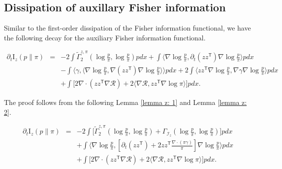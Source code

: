 \documentclass[11pt,reqno]{amsart}
\newcommand{\la}{\langle}
\newcommand{\ra}{\rangle}
\newcommand{\ts}{\mathsf{T}}
\newcommand{\bea}{\begin{eqnarray}}
\newcommand{\eea}{\end{eqnarray}}
\def\pa{\partial}
\begin{document}
\subsection{Dissipation of auxillary Fisher information}\label{sec fish z}
Similar to the first-order dissipation of the Fisher information functional, we have the following decay for the auxiliary Fisher information functional. 
\begin{proposition}
	\label{prop: dissipation of fisher z}
	\bea
\pa_t\mathrm I_{z}({p} \|\pi) &=& -2\int \widetilde\Gamma_2^{z,\pi}(\log\frac{{p} }{\pi},\log\frac{{p} }{\pi}){p}  dx
+\int \la \nabla\log\frac{{p} }{\pi},\pa_t(zz^{\ts})\nabla\log\frac{{p} }{\pi}\ra {p}  dx\nonumber \\
&&-\int \la \gamma,\la \nabla \log\frac{{p} }{\pi}, \nabla(zz^{\ts})\nabla \log\frac{{p} }{\pi}\ra \ra {p}  dx+2\int \la zz^{\ts}\nabla \log\frac{{p} }{\pi}, \nabla \gamma \nabla \log\frac{{p} }{\pi}\ra {p}  dx \nonumber\\
	&& +\int\big[
	2\nabla\cdot(zz^{\ts}\nabla\mathcal{R})+2 \la \nabla \mathcal R, zz^{\ts}\nabla\log\pi\ra \big]{p}  dx.
	\eea
\end{proposition}
The proof follows from the following Lemma \ref{lemma z: 1}
 and Lemma \ref{lemma z: 2}. 
 \begin{lemma}\label{lemma z: 1}
	\bea
\pa_t\mathrm I_{z}({p} \|\pi) &=& -2\int\big[\widetilde \Gamma^{z, \pi}_2(\log\frac{{p} }{\pi},\log\frac{{p} }{\pi})+\Gamma_{\mathcal I_z}(\log\frac{{p} }{\pi},\log\frac{{p} }{\pi}) \big]{p}  dx\\
&&+\int \la \nabla\log\frac{{p} }{\pi},[\pa_t(zz^{\ts})+2zz^{\ts}\frac{\nabla\cdot(\pi\gamma)}{\pi}]\nabla\log\frac{{p} }{\pi}\ra {p}  dx\nonumber \\
	&& +\int\big[
	2\nabla\cdot(zz^{\ts}\nabla\mathcal{R})+2 \la \nabla \mathcal R, zz^{\ts}\nabla\log\pi\ra \big]{p}  dx.\nonumber
	\eea
\end{lemma}
\end{document}
